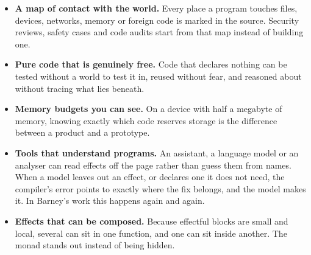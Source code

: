 \begin{itemize}
  \item \textbf{A map of contact with the world.} Every place a program
        touches files, devices, networks, memory or foreign code is marked in
        the source. Security reviews, safety cases and code audits start from
        that map instead of building one.
  \item \textbf{Pure code that is genuinely free.} Code that declares nothing
        can be tested without a world to test it in, reused without fear, and
        reasoned about without tracing what lies beneath.
  \item \textbf{Memory budgets you can see.} On a device with half a megabyte
        of memory, knowing exactly which code reserves storage is the
        difference between a product and a prototype.
  \item \textbf{Tools that understand programs.} An assistant, a language
        model or an analyser can read effects off the page rather than guess
        them from names. When a model leaves out an effect, or declares
        one it does not need, the compiler's error points to exactly where the
        fix belongs, and the model makes it. In Barney's work this happens
        again and again.
  \item \textbf{Effects that can be composed.} Because effectful blocks are
        small and local, several can sit in one function, and one can sit
        inside another. The monad stands out instead of being hidden.
\end{itemize}
